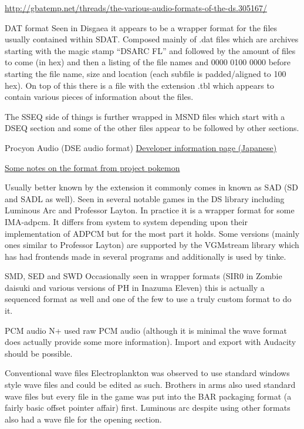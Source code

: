 \documentclass[
]{book}
\begin{document}
\url{http://gbatemp.net/threads/the-various-audio-formats-of-the-ds.305167/}

DAT format Seen in Disgaea it appears to be a wrapper format for the files usually contained within SDAT. Composed mainly of .dat files which are archives starting with the magic stamp ``DSARC FL'' and followed by the amount of files to come (in hex) and then a listing of the file names and 0000 0100 0000 before starting the file name, size and location (each subfile is padded/aligned to 100 hex). On top of this there is a file with the extension .tbl which appears to contain various pieces of information about the files.

The SSEQ side of things is further wrapped in MSND files which start with a DSEQ section and some of the other files appear to be followed by other sections.

Procyon Audio (DSE audio format) \href{http://www.procyon-studio.co.jp/dse/}{Developer information page (Japanese)}

\href{http://projectpokemon.org/wiki/Digital_Sound_Elements}{Some notes on the format from project pokemon}

Usually better known by the extension it commonly comes in known as SAD (SD and SADL as well). Seen in several notable games in the DS library including Luminous Arc and Professor Layton. In practice it is a wrapper format for some IMA-adpcm. It differs from system to system depending upon their implementation of ADPCM but for the most part it holds. Some versions (mainly ones similar to Professor Layton) are supported by the VGMstream library which has had frontends made in several programs and additionally is used by tinke.

SMD, SED and SWD Occasionally seen in wrapper formats (SIR0 in Zombie daisuki and various versions of PH in Inazuma Eleven) this is actually a sequenced format as well and one of the few to use a truly custom format to do it.

PCM audio N+ used raw PCM audio (although it is minimal the wave format does actually provide some more information). Import and export with Audacity should be possible.

Conventional wave files Electroplankton was observed to use standard windows style wave files and could be edited as such. Brothers in arms also used standard wave files but every file in the game was put into the BAR packaging format (a fairly basic offset pointer affair) first. Luminous arc despite using other formats also had a wave file for the opening section.
\end{document}
